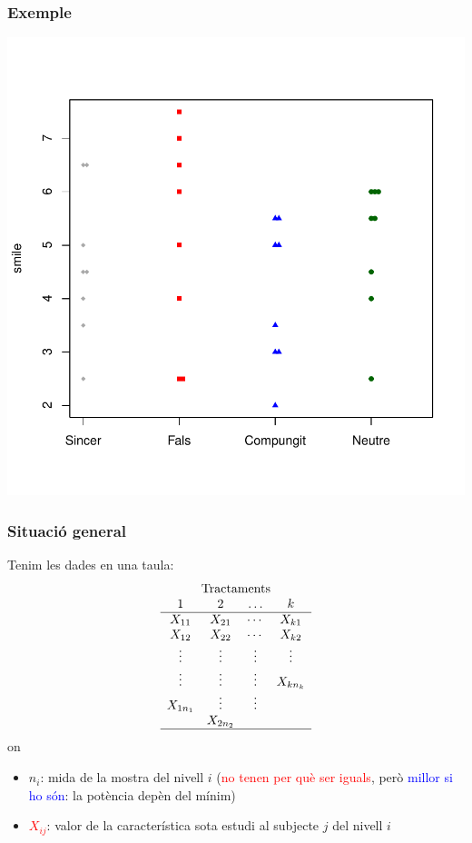 \documentclass[12pt,t]{beamer}
\newcommand{\red}[1]{\textcolor{red}{#1}}
\newcommand{\blue}[1]{\textcolor{blue}{#1}}
\renewcommand{\emph}[1]{{\color{red}#1}}
\theoremstyle{plain}
\theoremstyle{definition}
\begin{document}
\begin{frame}
\frametitle{Exemple}\vspace*{-2ex}

\begin{center}
\includegraphics[width=0.8\linewidth]{plotsmile1}
\end{center}

\end{frame}


\begin{frame}
\frametitle{Situació general}

Tenim les dades en una taula:
$$
\begin{array}{c}
\text{Tractaments}\\
\begin{array}{cccc}
 1 & 2 &\ldots & k \\\hline
 X_{11} & X_{21} & \cdots & X_{k1} \\
 X_{12} & X_{22} & \cdots & X_{k2} \\
 \vdots & \vdots & \vdots & \vdots \\
\vdots & \vdots & \vdots & X_{kn_k} \\
X_{1n_1}  & \vdots & \vdots &  \\
 & X_{2n_2} &  &  \\\hline
\end{array}
\end{array}
$$
on 
\begin{itemize}
\item \emph{$n_i$}: mida de la mostra del nivell $i$ (\red{no tenen per què ser iguals}, però  \blue{millor si ho són}: la potència depèn del mínim)\medskip

\item \red{$X_{ij}$}: valor de la característica sota estudi al subjecte $j$ del nivell $i$
\medskip

\end{itemize}
\end{frame}
\end{document}
